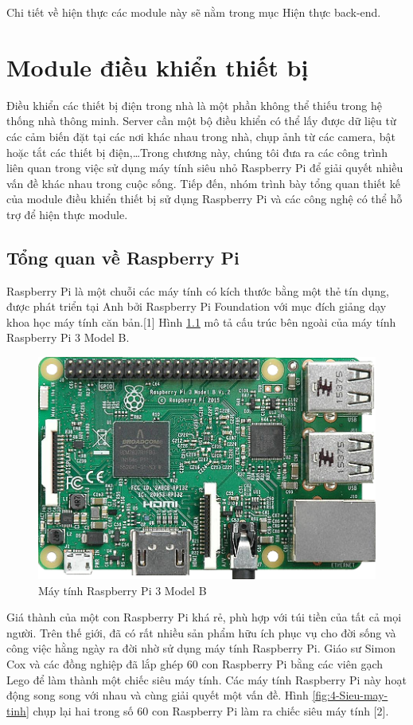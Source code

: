 \documentclass[11pt,a4paper,oneside]{book}
\begin{document}
Chi tiết về hiện thực các module này sẽ nằm trong mục Hiện thực back-end.

\chapter{Module điều khiển thiết bị}
Điều khiển các thiết bị điện trong nhà là một phần không thể thiếu trong hệ thống nhà thông minh. Server cần một bộ điều khiển có thể lấy được dữ liệu từ các cảm biến đặt tại các nơi khác nhau trong nhà, chụp ảnh từ các camera, bật hoặc tắt các thiết bị điện,…Trong chương này, chúng tôi đưa ra các công trình liên quan trong việc sử dụng máy tính siêu nhỏ Raspberry Pi để giải quyết nhiều vấn đề khác nhau trong cuộc sống. Tiếp đến, nhóm trình bày tổng quan thiết kế của module điều khiển thiết bị sử dụng Raspberry Pi và các công nghệ có thể hỗ trợ để hiện thực module.
\newpage
\section{Tổng quan về Raspberry Pi}
Raspberry Pi là một chuỗi các máy tính có kích thước bằng một thẻ tín dụng, được phát triển tại Anh bởi Raspberry Pi Foundation với mục đích giảng dạy khoa học máy tính căn bản.[1] Hình \ref{fig:4-pi3-model-b} mô tả cấu trúc bên ngoài của máy tính Raspberry Pi 3 Model B.

\begin{figure}[h]
  \centering
     \includegraphics[scale=0.3]{4-pi3-model-b}
  \caption{Máy tính Raspberry Pi 3 Model B}\label{fig:4-pi3-model-b}
\end{figure}

Giá thành của một con Raspberry Pi khá rẻ, phù hợp với túi tiền của tất cả mọi người. Trên thế giới, đã có rất nhiều sản phẩm hữu ích phục vụ cho đời sống và công việc hằng ngày ra đời nhờ sử dụng máy tính Raspberry Pi. Giáo sư Simon Cox và các đồng nghiệp đã lắp ghép 60 con Raspberry Pi bằng các viên gạch Lego để làm thành một chiếc siêu máy tính. Các máy tính Raspberry Pi này hoạt động song song với nhau và cùng giải quyết một vấn đề. Hình \ref{fig:4-Sieu-may-tinh} chụp lại hai trong số 60 con Raspberry Pi làm ra chiếc siêu máy tính [2].
\end{document}
